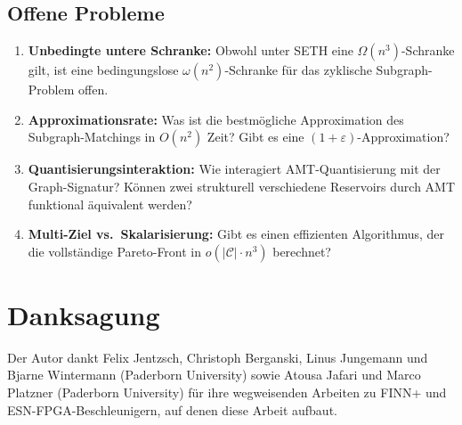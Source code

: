 ﻿\documentclass[a4paper,12pt]{article}
\theoremstyle{definition}
\begin{document}
\subsection{Offene Probleme}

\begin{enumerate}
    \item \textbf{Unbedingte untere Schranke:} Obwohl unter SETH eine $\Omega(n^3)$-Schranke
          gilt, ist eine bedingungslose $\omega(n^2)$-Schranke für das zyklische Subgraph-Problem
          offen.
    
    \item \textbf{Approximationsrate:} Was ist die bestmögliche Approximation des
          Subgraph-Matchings in $O(n^2)$ Zeit? Gibt es eine $(1+\varepsilon)$-Approximation?
    
    \item \textbf{Quantisierungsinteraktion:} Wie interagiert AMT-Quantisierung mit der
          Graph-Signatur? Können zwei strukturell verschiedene Reservoirs durch AMT
          funktional äquivalent werden?
    
    \item \textbf{Multi-Ziel vs.\ Skalarisierung:} Gibt es einen effizienten Algorithmus,
          der die vollständige Pareto-Front in $o(|\mathcal{C}| \cdot n^3)$ berechnet?
\end{enumerate}

\section*{Danksagung}

Der Autor dankt Felix Jentzsch, Christoph Berganski, Linus Jungemann und Bjarne Wintermann
(Paderborn University) sowie Atousa Jafari und Marco Platzner (Paderborn University)
für ihre wegweisenden Arbeiten zu FINN+ und ESN-FPGA-Beschleunigern,
auf denen diese Arbeit aufbaut.
\end{document}
